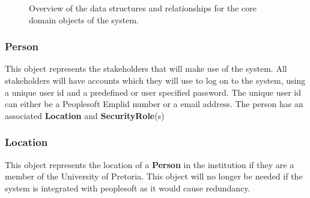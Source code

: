 \documentclass[12pt]{article}
\begin{document}
\begin{figure}[H]
\centering	
{}
\caption{Overview of the data structures and relationships for the core domain objects of the
system.}
\end{figure}

\newpage
\subsubsection{Person}
This object represents the stakeholders that will make use of the system. All stakeholders will have accounts which they will use to log on to the system, using a unique user id and a predefined or user specified password. The unique user id can either be a Peoplesoft Emplid number or a email address. The person has an associated \textbf{Location} and \textbf{SecurityRole}(s)

\subsubsection{Location}
This object represents the location of a \textbf{Person} in the institution if they are a member of the University of Pretoria. This object will no longer be needed if the system is integrated with peoplesoft as it would cause redundancy.
\end{document}
